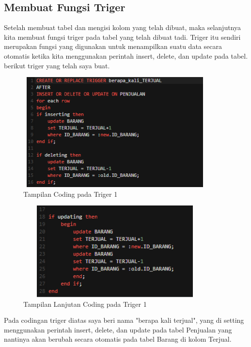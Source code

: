 \documentclass[a4paper, 12pt]{article}
\begin{document}
\begin{enumerate}
\subsection{Membuat Fungsi Triger}
\par Setelah membuat tabel dan mengisi kolom yang telah dibuat, maka selanjutnya kita membuat fungsi triger pada tabel yang telah dibuat tadi. Triger itu sendiri merupakan fungsi yang digunakan untuk menampilkan suatu data secara otomatis ketika kita menggunakan perintah insert, delete, dan update pada tabel. berikut triger yang telah saya buat.

            \begin{figure}[!htbp]
            \centering
            \includegraphics[width=10cm,height=6cm]{gambar/1-Triger.PNG}
            \caption{Tampilan Coding pada Triger 1}
            \label{penanda}
            \end{figure}

            \begin{figure}[!htbp]
            \centering
            \includegraphics[width=10cm,height=5cm]{gambar/2-Triger.PNG}
            \caption{Tampilan Lanjutan Coding pada Triger 1}
            \label{penanda}
            \end{figure}
            
\par Pada codingan triger diatas saya beri nama "berapa kali terjual", yang di setting menggunakan perintah insert, delete, dan update pada tabel Penjualan yang nantinya akan berubah secara otomatis pada tabel Barang di kolom Terjual.


\end{enumerate}
\end{document}
